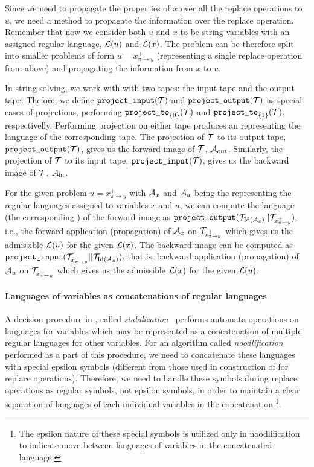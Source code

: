 Since we need to propagate the properties of $x$ over all the replace operations to $u$, we need a method to propagate the information over the replace operation.
Remember that now we consider both $u$ and $x$ to be string variables with an assigned regular language, $\mathcal{L}(u)$ and $\mathcal{L}(x)$.
The problem can be therefore split into smaller problems of form $ u = x^{+}_{\pi \rightarrow y}$ (representing a single replace operation from above) and propagating the information from $x$ to $u$.

In string solving, we work with \nfts with two tapes: the input tape and the output tape.
Thefore, we define $\texttt{project\_input}(\mathcal{T})$ and $\texttt{project\_output}(\mathcal{T})$ as special cases of projections, performing $\texttt{project\_to}_{\{ 0 \}}(\mathcal{T})$ and $\texttt{project\_to}_{\{ 1 \}}(\mathcal{T})$, respectivelly.
Performing projection on either tape produces an \nfa representing the language of the corresponding tape.
The projection of \nft $\mathcal{T}$ to its output tape, $\texttt{project\_output}(\mathcal{T})$, gives us the forward image of $\mathcal{T}$, \nfa $\mathcal{A}_{\text{out}}$.
Similarly, the projection of \nft $\mathcal{T}$ to its input tape, $\texttt{project\_input}(\mathcal{T})$, gives us the backward image of $\mathcal{T}$, \nfa $\mathcal{A}_{\text{in}}$.

For the given problem $ u = x^{+}_{\pi \rightarrow y}$ with $\mathcal{A}_x$ and $\mathcal{A}_u$ being the \nfas representing the regular languages assigned to variables $x$ and $u$, we can compute the language (the corresponding \nfa) of the forward image as $\texttt{project\_output}(\mathcal{T}_{\text{Id}(\mathcal{A}_x)} || \mathcal{T}_{x^+_{\pi \rightarrow y}})$, i.e., the forward application (propagation) of $\mathcal{A}_x$ on $\mathcal{T}_{x^+_{\pi \rightarrow y}}$ which gives us the admissible $\mathcal{L}(u)$ for the given $\mathcal{L}(x)$.
The backward image can be computed as $\texttt{project\_input}(\mathcal{T}_{x^+_{\pi \rightarrow y}} || \mathcal{T}_{\text{Id}(\mathcal{A}_u)})$, that is, backward application (propagation) of $\mathcal{A}_u$ on $\mathcal{T}_{x^+_{\pi \rightarrow y}}$ which gives us the admissible $\mathcal{L}(x)$ for the given $\mathcal{L}(u)$.

\paragraph{Languages of variables as concatenations of regular languages}
A decision procedure in \noodler, called \emph{stabilization}~\cite{oopsla23_stabilization_DBLP:journals/pacmpl/ChenCHHLS23}
performs automata operations on languages for variables which may be represented as a concatenation of multiple regular languages for other variables.
For an algorithm called \emph{noodlification} performed as a part of this procedure, we need to concatenate these languages with special epsilon symbols (different from those used in construction of \nfts for replace operations).
Therefore, we need to handle these symbols during replace operations as regular symbols, not epsilon symbols, in order to maintain a clear separation of languages of each individual variables in the concatenation.\footnote{The epsilon nature of these special symbols is utilized only in noodlification to indicate move between languages of variables in the concatenated language.}.

